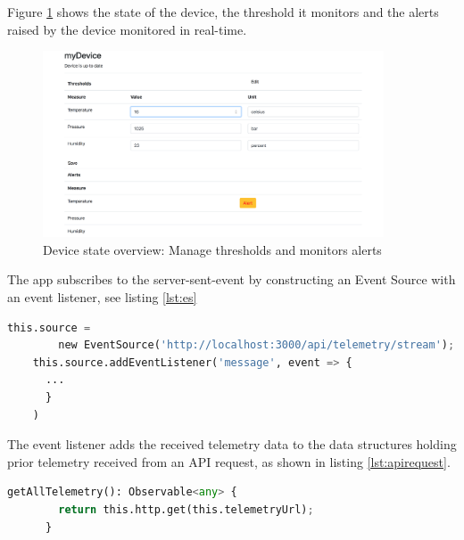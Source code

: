 Figure \ref{fig:deviceoverview} shows the state of the device, the threshold it monitors and the alerts raised by the device monitored in real-time.

\begin{figure}[H]
    \centering
    \includegraphics[width=0.9\textwidth]{figures/App/app_device_settings}
    \caption{Device state overview: Manage thresholds and monitors alerts}
    \label{fig:deviceoverview}
\end{figure}

The app subscribes to the server-sent-event by constructing an Event Source with an event listener, see listing \ref{lst:es}

\begin{lstlisting}[language=Python, caption=Event Source, label={lst:es}]
    this.source = 
        new EventSource('http://localhost:3000/api/telemetry/stream');
    this.source.addEventListener('message', event => {
      ...
      }
    )
\end{lstlisting}

The event listener adds the received telemetry data to the data structures holding prior telemetry received from an API request, as shown in listing \ref{lst:apirequest}. 


\begin{lstlisting}[language=Python, caption=API Request, label={lst:apirequest}]
    getAllTelemetry(): Observable<any> {
        return this.http.get(this.telemetryUrl);
      }
\end{lstlisting}